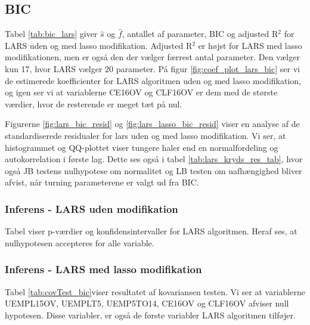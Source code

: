 \subsection{BIC}
Tabel \ref{tab:bic_lars} giver $\widehat{s}$ og $\widehat{f}$, antallet af parameter, BIC og adjusted R$^2$ for LARS uden og med lasso modifikation. 
Adjusted R$^2$ er højst for LARS med lasso modifikationen, men er også den der vælger færrest antal parameter. 
Den vælger kun 17, hvor LARS vælger 20 parameter. 
På figur \ref{fig:coef_plot_lars_bic} ser vi de estimerede koefficienter for LARS algoritmen uden og med lasso modifikation, og igen ser  vi at variablerne \textcolor{blue3}{CE16OV} og \textcolor{blue3}{CLF16OV} er dem med de største værdier, hvor de resterende er meget tæt på nul. 




Figurerne \ref{fig:lars_bic_resid} og  \ref{fig:lars_lasso_bic_resid} viser en analyse af de standardiserede residualer for lars uden og med lasso modifikation. Vi ser, at histogrammet og QQ-plottet viser tungere haler end en normalfordeling og autokorrelation i første lag. Dette ses også i tabel \ref{tab:lars_kryds_res_tab}, hvor også JB testens nulhypotese om normalitet og LB testen om uafhængighed bliver afvist, når turning parameterene er valgt ud fra BIC. 


\subsubsection{Inferens - LARS uden modifikation}
Tabel  viser p-værdier og konfidensintervaller for LARS algoritmen. Heraf ses, at nulhypotesen accepteres for alle variable.




\subsubsection{Inferens - LARS med lasso modifikation}
Tabel \ref{tab:covTest_bic}viser resultatet af  kovariansen testen. Vi ser at variablerne \textcolor{blue3}{UEMPL15OV}, \textcolor{blue3}{UEMPLT5}, \textcolor{blue3}{UEMP5TO14}, \textcolor{blue3}{CE16OV} og \textcolor{blue3}{CLF16OV} afviser null hypotesen. Disse variabler, er også de første variabler LARS algoritmen tilføjer.  


